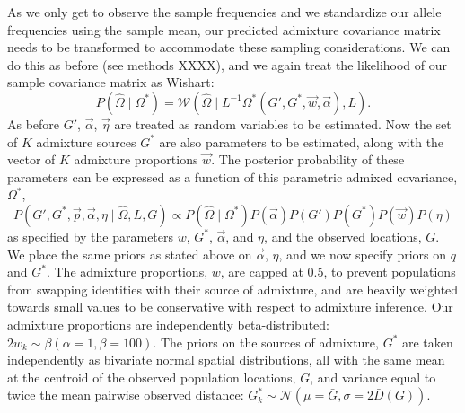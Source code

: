 \documentclass[12pt]{article}
\newcommand{\identifyadmixsource}[1]{{#1^{*}}}
\begin{document}
As we only get to observe the sample frequencies and we standardize our allele frequencies using the sample mean, our predicted admixture covariance matrix needs to be transformed to accommodate these sampling considerations. We can do this as before (see methods XXXX), and we again treat the likelihood of our sample covariance matrix as Wishart:
\begin{equation}
\label{eq:wishart_dist_admixed}
P(\widehat{\Omega} \mid \identifyadmixsource{\Omega}) = 
	\mathcal{W}\left(\widehat{\Omega} \mid L^{-1} \identifyadmixsource{\Omega} \left( G',\identifyadmixsource{G}, \vec{w},\vec{\alpha}\right),L \right)	\text{.}
\end{equation}
As before $G'$, $\vec{\alpha}$, $\vec{\eta}$ are treated as random variables to be estimated. Now the set of $K$ admixture sources $\identifyadmixsource{G}$ are also parameters to be estimated, along with the vector of $K$ admixture proportions $\vec{w}$. The posterior probability of these parameters can be expressed as a function of this parametric admixed covariance, $\identifyadmixsource{\Omega}$,
\begin{equation}
\label{eq:admixed_post_prob}
P(G',\identifyadmixsource{G}, \vec{p},\vec{\alpha}, \eta \mid \widehat{\Omega}, L,G) 
	\propto  
		P(\widehat{\Omega}  \mid \identifyadmixsource{\Omega}) P(\vec{\alpha}) P(G') P(\identifyadmixsource{G}) P(\vec{w}) P(\eta) 
\end{equation}
%
as specified by the parameters $w$, $\identifyadmixsource{G}$, $\vec{\alpha}$, and $\eta$, and the observed locations, $G$.  We place the same priors as stated above on $\vec{\alpha}$, $\eta$, and we now specify priors on $q$ and $\identifyadmixsource{G}$.  The admixture proportions, $w$, are capped at 0.5, to prevent populations from swapping identities with their source of admixture, and are heavily weighted towards small values to be conservative with respect to admixture inference.  Our admixture proportions are independently beta-distributed: $2 w_k \sim \beta(\alpha = 1,\beta = 100)$.  The priors on the sources of admixture, $\identifyadmixsource{G}$ are taken independently as bivariate normal spatial distributions, all with the same mean at the centroid of the observed population locations, $G$, and variance equal to twice the mean pairwise observed distance:  $\identifyadmixsource{G_k} \sim \mathcal{N}(\mu = \bar{G},\sigma = 2 \bar{D}(G))$.
\end{document}
